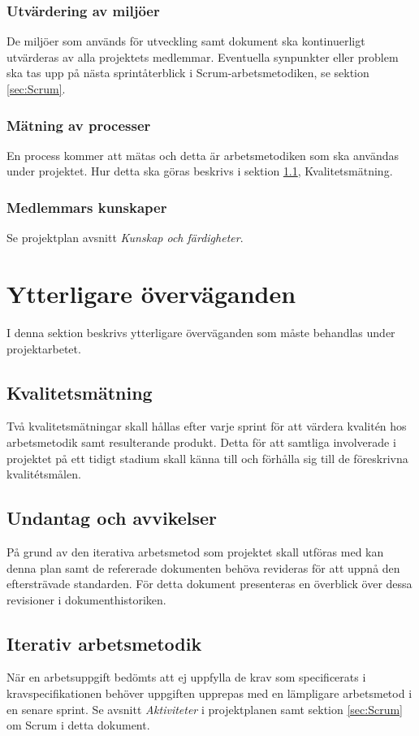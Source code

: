 \documentclass[a4paper,10pt]{article}
\begin{document}
\subsubsection{Utvärdering av miljöer}
De miljöer som används för utveckling samt dokument ska kontinuerligt utvärderas av alla projektets medlemmar. Eventuella synpunkter eller problem ska tas upp på nästa sprintåterblick i Scrum-arbetsmetodiken, se sektion \ref{sec:Scrum}.

\subsubsection{Mätning av processer}
En process kommer att mätas och detta är arbetsmetodiken som ska användas under projektet. Hur detta ska göras beskrivs i sektion \ref{sec:Kvalitetsmatning}, Kvalitetsmätning.

\subsubsection{Medlemmars kunskaper}
Se projektplan avsnitt \emph{Kunskap och färdigheter}.

\section{Ytterligare överväganden}
I denna sektion beskrivs ytterligare överväganden som måste behandlas under projektarbetet.
\subsection{Kvalitetsmätning}
\label{sec:Kvalitetsmatning}
Två kvalitetsmätningar skall hållas efter varje sprint för att värdera kvalitén hos arbetsmetodik samt resulterande produkt.
Detta för att samtliga involverade i projektet på ett tidigt stadium skall känna till och förhålla sig till de föreskrivna kvalitétsmålen.

\subsection{Undantag och avvikelser}
På grund av den iterativa arbetsmetod som projektet skall utföras med kan  denna plan samt de refererade dokumenten behöva revideras för att uppnå den eftersträvade standarden. För detta dokument presenteras en överblick över dessa revisioner i dokumenthistoriken.

\subsection{Iterativ arbetsmetodik}
När en arbetsuppgift bedömts att ej uppfylla de krav som specificerats i kravspecifikationen behöver uppgiften upprepas med en lämpligare arbetsmetod i en senare sprint. Se avsnitt \emph{Aktiviteter} i projektplanen samt sektion \ref{sec:Scrum} om Scrum i detta dokument.
\end{document}

